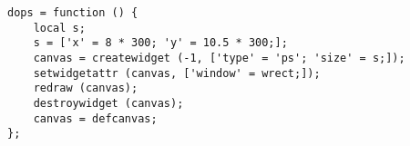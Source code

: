 \begin{verbatim}
dops = function () {
    local s;
    s = ['x' = 8 * 300; 'y' = 10.5 * 300;];
    canvas = createwidget (-1, ['type' = 'ps'; 'size' = s;]);
    setwidgetattr (canvas, ['window' = wrect;]);
    redraw (canvas);
    destroywidget (canvas);
    canvas = defcanvas;
};
\end{verbatim}
